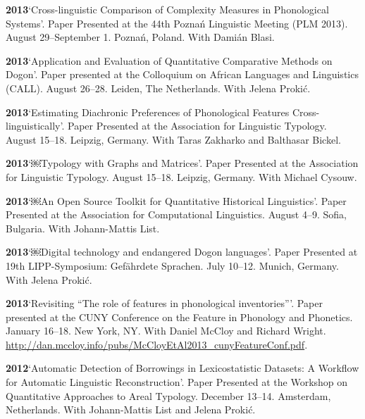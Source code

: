 \documentclass[11pt]{article}
\newcommand{\hangpara}{
 \setlength{\parindent}{0in} %
 \hangindent=0.42in %
}
\begin{document}
\vskip 6pt
\hangpara
{\bf 2013}\hspace{1ex}`Cross-linguistic Comparison of Complexity Measures in Phonological Systems'. Paper Presented at the 44th Pozna{\'n} Linguistic Meeting (PLM 2013). August 29--September 1. Pozna{\'n}, Poland. With Dami{\'a}n Blasi.

\vskip 6pt
\hangpara
{\bf 2013}\hspace{1ex}`Application and Evaluation of Quantitative Comparative Methods on Dogon'. Paper presented at the Colloquium on African Languages and Linguistics (CALL). August 26--28. Leiden, The Netherlands. With Jelena Proki{\'c}.

\vskip 6pt
\hangpara
{\bf 2013}\hspace{1ex}`Estimating Diachronic Preferences of Phonological Features Cross-linguistically'. Paper Presented at the Association for Linguistic Typology. August 15--18. Leipzig, Germany. With Taras Zakharko and Balthasar Bickel.

\vskip 6pt
\hangpara
{\bf 2013}\hspace{1ex}`￼Typology with Graphs and Matrices'. Paper Presented at the Association for Linguistic Typology. August 15--18. Leipzig, Germany. With Michael Cysouw.

\vskip 6pt
\hangpara
{\bf 2013}\hspace{1ex}`￼An Open Source Toolkit for Quantitative Historical Linguistics'. Paper Presented at the Association for Computational Linguistics. August 4--9. Sofia, Bulgaria. With Johann-Mattis List.

\vskip 6pt
\hangpara
{\bf 2013}\hspace{1ex}`￼Digital technology and endangered Dogon languages'. Paper Presented at 19th LIPP-Symposium: Gef{\"a}hrdete Sprachen. July 10--12. Munich, Germany. With Jelena Proki{\'c}.

\vskip 6pt
\hangpara
{\bf 2013}\hspace{1ex}`Revisiting ``The role of features in phonological inventories'''. Paper presented at the CUNY Conference on the Feature in Phonology and Phonetics. January 16--18. New York, NY. With Daniel McCloy and Richard Wright. \url{http://dan.mccloy.info/pubs/McCloyEtAl2013_cunyFeatureConf.pdf}.

\vskip 6pt
\hangpara
{\bf 2012}\hspace{1ex}`Automatic Detection of Borrowings in Lexicostatistic Datasets: A Workflow for Automatic Linguistic Reconstruction'. Paper Presented at the Workshop on Quantitative Approaches to Areal Typology. December 13--14. Amsterdam, Netherlands. With Johann-Mattis List and Jelena Proki{\'c}.
\end{document}
